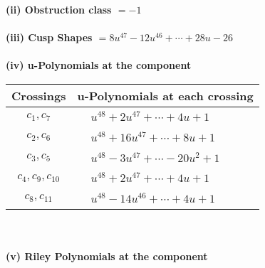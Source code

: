 \documentclass[1p]{elsarticle_modified}
\theoremstyle{definition}
\begin{document}
\flushleft \textbf{(ii) Obstruction class $= -1$}\\~\\
\flushleft \textbf{(iii) Cusp Shapes $= 8 u^{47}-12 u^{46}+\cdots+28 u-26$}\\~\\
\newpage\renewcommand{\arraystretch}{1}
\flushleft \textbf{(iv) u-Polynomials at the component}\newline \\
\begin{tabular}{m{50pt}|m{274pt}}
Crossings & \hspace{64pt}u-Polynomials at each crossing \\
\hline $$\begin{aligned}c_{1},c_{7}\end{aligned}$$&$\begin{aligned}
&u^{48}+2 u^{47}+\cdots+4 u+1
\end{aligned}$\\
\hline $$\begin{aligned}c_{2},c_{6}\end{aligned}$$&$\begin{aligned}
&u^{48}+16 u^{47}+\cdots+8 u+1
\end{aligned}$\\
\hline $$\begin{aligned}c_{3},c_{5}\end{aligned}$$&$\begin{aligned}
&u^{48}-3 u^{47}+\cdots-20 u^2+1
\end{aligned}$\\
\hline $$\begin{aligned}c_{4},c_{9},c_{10}\end{aligned}$$&$\begin{aligned}
&u^{48}+2 u^{47}+\cdots+4 u+1
\end{aligned}$\\
\hline $$\begin{aligned}c_{8},c_{11}\end{aligned}$$&$\begin{aligned}
&u^{48}-14 u^{46}+\cdots+4 u+1
\end{aligned}$\\
\hline
\end{tabular}\\~\\
\newpage\renewcommand{\arraystretch}{1}
\flushleft \textbf{(v) Riley Polynomials at the component}\newline \\
\end{document}
